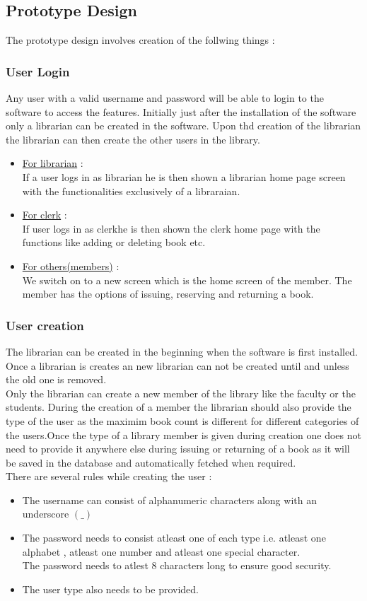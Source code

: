 \documentclass[a4paper]{article}
\begin{document}
\subsection{Prototype Design}
The prototype design involves creation of the follwing things :

\subsubsection*{User Login}
Any user with a valid username and password will be able to login to the software to access the features. Initially just after the installation of the software only a librarian can be created in the software. Upon thd creation of the librarian the librarian can then create the other users in the library.
\begin{itemize}
\item \underline{For librarian} :\\ If a user logs in as librarian he is then shown a librarian home page screen with the functionalities exclusively of a libraraian.
\item \underline{For clerk} :\\ If user logs in as clerkhe is then shown the clerk home page with the functions like adding or deleting book etc.
\item \underline{For others(members)} : \\We switch on to a new screen which is the home screen of the member. The member has the options of issuing, reserving and returning a book.
\end{itemize}

\subsubsection*{User creation}
The librarian can be created in the beginning when the software is first installed. Once a librarian is creates an new librarian can not be created until and unless the old one is removed.
\\
Only the librarian can create a new member of the library like the faculty or the students.
During the creation of a member the librarian should also provide the type of the user as the maximim book count is different for different categories of the users.Once the type of a library member is given during creation one does not need to provide it anywhere else during issuing or returning of a book as it will be saved in the database and automatically fetched when required.\\
There are several rules while creating the user :
\begin{itemize}
\item The username can consist of alphanumeric characters along with an underscore $(\_)$
\item The password needs to consist atleast one of each type i.e. atleast one alphabet , atleast one number and atleast one special character.\\
The password needs to atlest 8 characters long to ensure good security.
\item The user type also needs to be provided.

\end{itemize}
\end{document}
